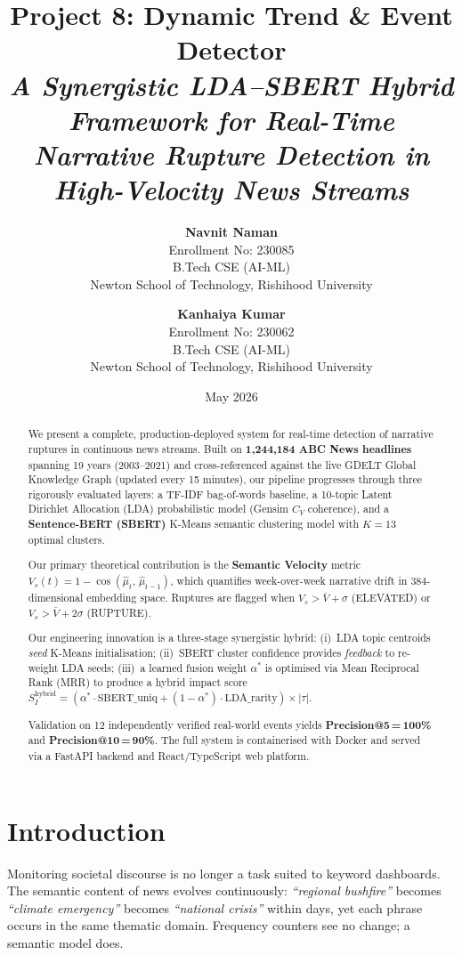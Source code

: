 \documentclass[12pt,a4paper]{article}
\title{
    \textbf{Project 8: Dynamic Trend \& Event Detector} \\[0.4em]
    \large \textit{A Synergistic LDA--SBERT Hybrid Framework for Real-Time\\
    Narrative Rupture Detection in High-Velocity News Streams}
}
\author{
    \textbf{Navnit Naman} \\
    \small Enrollment No: 230085 \\
    \small B.Tech CSE (AI-ML) \\
    \small Newton School of Technology, Rishihood University
    \and
    \textbf{Kanhaiya Kumar} \\
    \small Enrollment No: 230062 \\
    \small B.Tech CSE (AI-ML) \\
    \small Newton School of Technology, Rishihood University
}
\date{May 2026}
\begin{document}
\maketitle

\begin{abstract}
We present a complete, production-deployed system for real-time detection of narrative ruptures
in continuous news streams. Built on \textbf{1,244,184 ABC News headlines} spanning 19 years
(2003--2021) and cross-referenced against the live GDELT Global Knowledge Graph (updated
every 15 minutes), our pipeline progresses through three rigorously evaluated layers: a TF-IDF
bag-of-words baseline, a 10-topic Latent Dirichlet Allocation (LDA) probabilistic model
(Gensim $C_V$ coherence), and a \textbf{Sentence-BERT (SBERT)} K-Means semantic clustering
model with $K{=}13$ optimal clusters.

Our primary theoretical contribution is the \textbf{Semantic Velocity} metric
$V_s(t) = 1 - \cos(\hat{\mu}_t,\, \hat{\mu}_{t-1})$, which quantifies week-over-week narrative
drift in 384-dimensional embedding space. Ruptures are flagged when $V_s > \bar{V} + \sigma$
(ELEVATED) or $V_s > \bar{V} + 2\sigma$ (RUPTURE).

Our engineering innovation is a three-stage synergistic hybrid: (i)~LDA topic centroids
\emph{seed} K-Means initialisation; (ii)~SBERT cluster confidence provides \emph{feedback}
to re-weight LDA seeds; (iii)~a learned fusion weight $\alpha^*$ is optimised via Mean
Reciprocal Rank (MRR) to produce a hybrid impact score
$S_I^{\text{hybrid}} = (\alpha^*\!\cdot\!\text{SBERT\_uniq} + (1{-}\alpha^*)\!\cdot\!\text{LDA\_rarity}) \times |\tau|$.

Validation on 12 independently verified real-world events yields
\textbf{Precision@5\,=\,100\%} and \textbf{Precision@10\,=\,90\%}.
The full system is containerised with Docker and served via a FastAPI backend and
React/TypeScript web platform.
\end{abstract}

\tableofcontents
\vspace{1em}

\section{Introduction}

Monitoring societal discourse is no longer a task suited to keyword dashboards.
The semantic content of news evolves continuously: \emph{``regional bushfire''} becomes
\emph{``climate emergency''} becomes \emph{``national crisis''} within days, yet each
phrase occurs in the same thematic domain. Frequency counters see no change; a semantic
model does.
\end{document}
